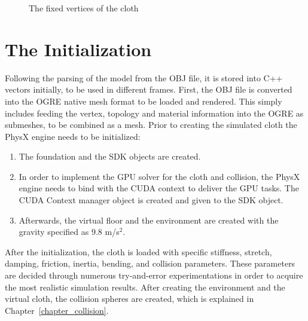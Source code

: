 \begin{figure}[h]
\centerline{}
\caption{The fixed vertices of the cloth}
\label{fig:cloth_fixed_vertices}
\end{figure}

\section{The Initialization}

Following the parsing of the model from the OBJ file, it is stored into C++ vectors initially, to be used in different frames. First, the OBJ file is converted into the OGRE native mesh format to be loaded and rendered. This simply includes feeding the vertex, topology and material information into the OGRE as submeshes, to be combined as a mesh. Prior to creating the simulated cloth the PhysX engine needs to be initialized:

\begin{enumerate}
\item The foundation and the SDK objects are created.
\item In order to implement the GPU solver for the cloth and collision, the PhysX engine needs to bind with the CUDA context to deliver the GPU tasks. The CUDA Context manager object is created and given to the SDK object.
\item Afterwards, the virtual floor and the environment are created with the gravity specified as 9.8 m/s$^2$. 
\end{enumerate}

After the initialization, the cloth is loaded with specific stiffness, stretch, damping, friction, inertia, bending, and collision parameters. These parameters are decided through numerous try-and-error experimentations in order to acquire the most realistic simulation results. After creating the environment and the virtual cloth, the collision spheres are created, which is explained in Chapter~\ref{chapter_collision}.

